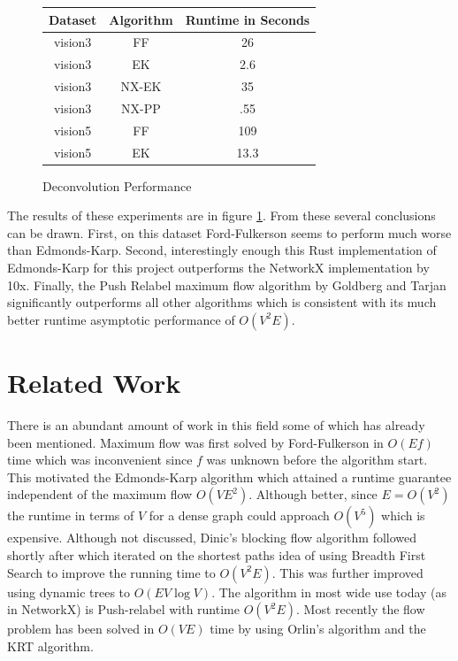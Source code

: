 \documentclass{article}
\begin{document}
\begin{figure}[!ht]
	\caption{Deconvolution Performance}
	\label{vision}
	\begin{tabular}{c | c | c}
		Dataset & Algorithm & Runtime in Seconds\\
		\hline
		vision3 & FF & 26\\
		vision3 & EK & 2.6\\
		vision3 & NX-EK & 35\\
		vision3 & NX-PP & .55\\
		vision5 & FF & 109\\
		vision5 & EK & 13.3\\
	\end{tabular}
\end{figure}

The results of these experiments are in figure \ref{vision}. From these several conclusions can be drawn. First, on this dataset Ford-Fulkerson seems to perform much worse than Edmonds-Karp. Second, interestingly enough this Rust implementation of Edmonds-Karp for this project outperforms the NetworkX implementation by 10x. Finally, the Push Relabel maximum flow algorithm by Goldberg and Tarjan significantly outperforms all other algorithms which is consistent with its much better runtime asymptotic performance of $O(V^2E)$\cite{goldberg1988new}.

\section{Related Work}
	There is an abundant amount of work in this field some of which has already been mentioned. Maximum flow was first solved by Ford-Fulkerson in $O(Ef)$ time which was inconvenient since $f$ was unknown before the algorithm start\cite{Ford:1956vc}. This motivated the Edmonds-Karp algorithm which attained a runtime guarantee independent of the maximum flow $O(VE^2)$\cite{Edmonds:1972ht}. Although better, since $E=O(V^2)$ the runtime in terms of $V$ for a dense graph could approach $O(V^5)$ which is expensive. Although not discussed, Dinic's blocking flow algorithm followed shortly after which iterated on the shortest paths idea of using Breadth First Search to improve the running time to $O(V^2E)$\cite{Dinic:lsM40ti7}. This was further improved using dynamic trees to $O(EV\log V)$. The algorithm in most wide use today (as in NetworkX) is Push-relabel with runtime $O(V^2E)$\cite{goldberg1988new}. Most recently the flow problem has been solved in $O(VE)$ time by using Orlin's algorithm and the KRT algorithm\cite{orlin2013max}.
\end{document}
